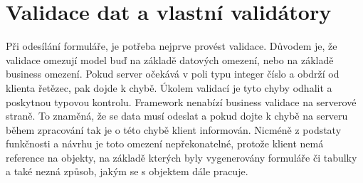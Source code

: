 \section{Validace dat a vlastní validátory}
Při odesílání formuláře, je potřeba nejprve provést validace. Důvodem je, že validace omezují model buď na základě datových omezení, nebo na základě business omezení. Pokud server očekává v poli typu integer číslo a obdrží od klienta řetězec, pak dojde k chybě. Úkolem validací je tyto chyby odhalit a poskytnou typovou kontrolu. Framework nenabízí business validace na serverové straně. To znaměná, že se data musí odeslat a pokud dojte k chybě na serveru během zpracování tak je o této chybě klient informován. Nicméně z podstaty funkčnosti a návrhu je toto omezení nepřekonatelné, protože klient nemá reference na objekty, na základě kterých byly vygenerovány formuláře či tabulky a také nezná způsob, jakým se s objektem dále pracuje. 
